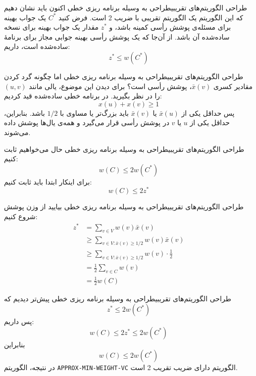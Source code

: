 \begin{itemframe-s}{طراحی الگوریتم‌های تقریبی}{طراحی به وسیله برنامه ریزی خطی}
\itm
اکنون باید نشان دهیم که این الگوریتم یک الگوریتم تقریبی با ضریب 2 است. فرض کنید
$C^*$
یک جواب بهینه برای مسئله‌ی پوشش رأسی کمینه باشد، و
$z^*$
مقدار یک جواب بهینه برای نسخه ساده‌شده آن باشد.
\itm
 از آن‌جا که یک پوشش رأسی بهینه جوابی مجاز برای برنامهٔ ساده‌شده است، داریم:
$$
z^* \leq w(C^*)
$$
\end{itemframe-s}


\begin{itemframe-s}{طراحی الگوریتم‌های تقریبی}{طراحی به وسیله برنامه ریزی خطی}
\itm
اما چگونه گرد کردن مقادیر کسری $\bar{x}(v)$، پوشش رأسی است؟
\itm
برای دیدن این موضوع، یالی مانند
$(u, v)$
را در نظر بگیرید. در برنامه خطی ساده‌شده قید کردیم:
$$
x(u) + x(v) \geq 1
$$
\itm
پس حداقل یکی از $\bar{x}(u)$ یا $\bar{x}(v)$ باید بزرگ‌تر یا مساوی با $1/2$ باشد. بنابراین، حداقل یکی از $u$ یا $v$ در پوشش رأسی قرار می‌گیرد و همه‌ی یال‌ها پوشش داده می‌شوند.
\end{itemframe-s}


\begin{itemframe-s}{طراحی الگوریتم‌های تقریبی}{طراحی به وسیله برنامه ریزی خطی}
\itm
حال می‌‌خواهیم ثابت کنیم:
$$
w(C) \leq 2 w(C^*)
$$
برای اینکار ابتدا باید ثابت کنیم:
$$
w(C) \leq 2 z^*
$$
\end{itemframe-s}


\begin{itemframe-s}{طراحی الگوریتم‌های تقریبی}{طراحی به وسیله برنامه ریزی خطی}
\itm
بیایید از وزن پوشش شروع کنیم:
\begin{align*}
z^* &= \sum_{v \in V} w(v) \bar{x}(v)\\[3pt]
&\geq \sum_{v \in V : \bar{x}(v) \geq 1/2} w(v) \bar{x}(v)\\[3pt]
&\geq \sum_{v \in V : \bar{x}(v) \geq 1/2} w(v) \cdot \tfrac{1}{2}\\[3pt]
&= \tfrac{1}{2} \sum_{v \in C} w(v)\\[3pt]
&= \tfrac{1}{2} w(C)
\end{align*}

\end{itemframe-s}


\begin{itemframe-s}{طراحی الگوریتم‌های تقریبی}{طراحی به وسیله برنامه ریزی خطی}
\itm
پیش‌تر دیدیم که
$$
z^* \leq 2 w(C^*)
$$
پس داریم:
$$
w(C) \leq 2 z^* \leq 2 w(C^*)
$$
\itm
بنابراین
$$
w(C) \leq 2 w(C^*)
$$
\itm
در نتیجه، الگوریتم
\texttt{APPROX-MIN-WEIGHT-VC}
الگوریتم دارای ضریب تقریب 2 است.
\end{itemframe-s}